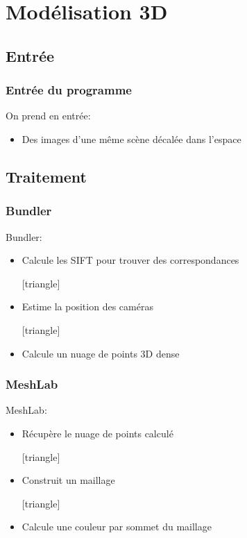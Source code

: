 
 \section{Modélisation 3D}
\subsection{Entrée}
	  
	  \begin{frame}
	  \frametitle{Entrée du programme}
	  On prend en entrée:
	  \begin{itemize}
	    
	    [triangle]
	    \item Des images d’une même scène décalée dans l’espace
	    \end{itemize}

	    
	  \end{frame}
	  
	  \subsection{Traitement}
	  
	  \begin{frame}
	  \frametitle{Bundler}
	   Bundler:
	  \begin{itemize}
	    [triangle]
	    \item Calcule les SIFT pour trouver des correspondances
	    
	    [triangle]
	    \item Estime la position des caméras
	    
	    [triangle]
	    \item Calcule un nuage de points 3D dense
	    \end{itemize}
	  \end{frame}
	  
	  
	  \begin{frame}
	  \frametitle{MeshLab}
	    MeshLab:
	  \begin{itemize}
	    [triangle]
	    \item Récupère le nuage de points calculé
	    
	    [triangle]
	    \item Construit un maillage
	    
	    [triangle]
	    \item Calcule une couleur par sommet du maillage
	    \end{itemize}
	 \end{frame}

